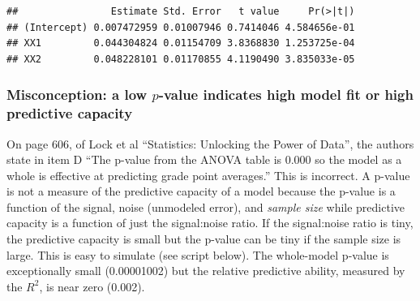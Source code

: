 \documentclass[]{book}
\newenvironment{Shaded}{\begin{snugshade}}{\end{snugshade}}
\newcommand{\KeywordTok}[1]{\textcolor[rgb]{0.13,0.29,0.53}{\textbf{#1}}}
\newcommand{\DataTypeTok}[1]{\textcolor[rgb]{0.13,0.29,0.53}{#1}}
\newcommand{\DecValTok}[1]{\textcolor[rgb]{0.00,0.00,0.81}{#1}}
\newcommand{\FloatTok}[1]{\textcolor[rgb]{0.00,0.00,0.81}{#1}}
\newcommand{\StringTok}[1]{\textcolor[rgb]{0.31,0.60,0.02}{#1}}
\newcommand{\OperatorTok}[1]{\textcolor[rgb]{0.81,0.36,0.00}{\textbf{#1}}}
\newcommand{\NormalTok}[1]{#1}
\begin{document}
\begin{verbatim}
##                Estimate Std. Error   t value     Pr(>|t|)
## (Intercept) 0.007472959 0.01007946 0.7414046 4.584656e-01
## XX1         0.044304824 0.01154709 3.8368830 1.253725e-04
## XX2         0.048228101 0.01170855 4.1190490 3.835033e-05
\end{verbatim}

\subsubsection{\texorpdfstring{Misconception: a low \(p\)-value
indicates high model fit or high predictive
capacity}{Misconception: a low p-value indicates high model fit or high predictive capacity}}\label{misconception-a-low-p-value-indicates-high-model-fit-or-high-predictive-capacity}

On page 606, of Lock et al ``Statistics: Unlocking the Power of Data'',
the authors state in item D ``The p-value from the ANOVA table is 0.000
so the model as a whole is effective at predicting grade point
averages.'' This is incorrect. A p-value is not a measure of the
predictive capacity of a model because the p-value is a function of the
signal, noise (unmodeled error), and \emph{sample size} while predictive
capacity is a function of just the signal:noise ratio. If the
signal:noise ratio is tiny, the predictive capacity is small but the
p-value can be tiny if the sample size is large. This is easy to
simulate (see script below). The whole-model p-value is exceptionally
small (0.00001002) but the relative predictive ability, measured by the
\(R^2\), is near zero (0.002).

\begin{Shaded}
\end{Shaded}
\end{document}

